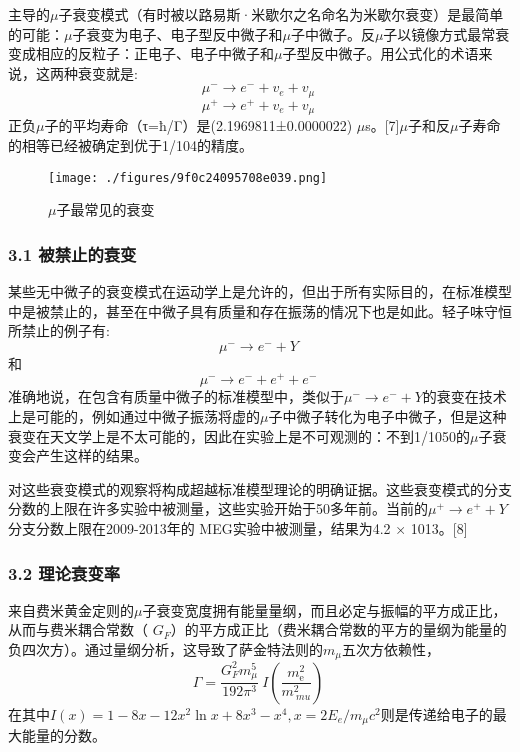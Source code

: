 主导的$\mu$子衰变模式（有时被以路易斯·米歇尔之名命名为米歇尔衰变）是最简单的可能：$\mu$子衰变为电子、电子型反中微子和$\mu$子中微子。反$\mu$子以镜像方式最常衰变成相应的反粒子：正电子、电子中微子和$\mu$子型反中微子。用公式化的术语来说，这两种衰变就是:
\begin{equation}
\mu^- \to e^-+v_e+v_\mu~
\end{equation}\begin{equation}
\mu^+ \to e^+ +v_e+v_\mu~
\end{equation}
正负$\mu$子的平均寿命（τ=ħ/Γ）是(2.1969811±0.0000022) $\mu$s。[7]$\mu$子和反$\mu$子寿命的相等已经被确定到优于1/104的精度。
\begin{figure}[ht]
\centering
\texttt{[image: ./figures/9f0c24095708e039.png]}
\caption{$\mu$子最常见的衰变} \label{fig_MZ_1}
\end{figure}
\subsubsection{3.1 被禁止的衰变}
某些无中微子的衰变模式在运动学上是允许的，但出于所有实际目的，在标准模型中是被禁止的，甚至在中微子具有质量和存在振荡的情况下也是如此。轻子味守恒所禁止的例子有:
\begin{equation}
\mu^- \to e^- + Y~
\end{equation}
和
\begin{equation}
\mu^- \to e^- +e^+ + e^-~
\end{equation}
准确地说，在包含有质量中微子的标准模型中，类似于$\mu^- \to e^- + Y$的衰变在技术上是可能的，例如通过中微子振荡将虚的$\mu$子中微子转化为电子中微子，但是这种衰变在天文学上是不太可能的，因此在实验上是不可观测的：不到1/1050的$\mu$子衰变会产生这样的结果。

对这些衰变模式的观察将构成超越标准模型理论的明确证据。这些衰变模式的分支分数的上限在许多实验中被测量，这些实验开始于50多年前。当前的$\mu^+ \to e^+ + Y$分支分数上限在2009-2013年的 MEG实验中被测量，结果为4.2 × 1013。[8]
\subsubsection{3.2 理论衰变率}
来自费米黄金定则的$\mu$子衰变宽度拥有能量量纲，而且必定与振幅的平方成正比，从而与费米耦合常数（  $G_F$）的平方成正比（费米耦合常数的平方的量纲为能量的负四次方）。通过量纲分析，这导致了萨金特法则的$m_\mu$五次方依赖性，
\begin{equation}
\Gamma=\frac{G^2_F m^5_\mu}{192\pi^3}~I\left({\frac{m_{\text {e}}^{2}}{m_{\ mu}^{2}}}\right)~
\end{equation}
在其中$I(x)=1-8x-12x^2\ln x+8x^3-x^4,x=2E_e/ m_\mu c^2$则是传递给电子的最大能量的分数。